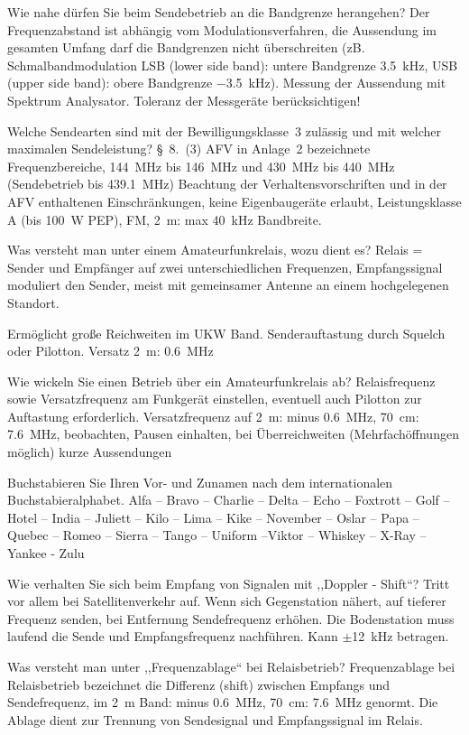 \documentclass[avery5371,grid,frame,a4paper]{flashcards}
\newcommand{\card}[3]{
  \begin{flashcard}[{\chap} -- #1]{#2}#3\end{flashcard}
}
\begin{document}
\card{09}{Wie nahe dürfen Sie beim Sendebetrieb an die Bandgrenze herangehen?}{
  Der Frequenzabstand ist abhängig vom Modulationsverfahren, die Aussendung im gesamten Umfang darf die Bandgrenzen nicht überschreiten (zB. Schmalbandmodulation LSB (lower side band): untere  Bandgrenze \SI{+3,5}{\kilo\Hz}, USB (upper side band): obere Bandgrenze \SI{-3,5}{\kilo\Hz}). Messung der Aussendung mit Spektrum Analysator. Toleranz der Messgeräte berücksichtigen!
}
\card{10}{Welche Sendearten sind mit der Bewilligungsklasse~3 zulässig und mit welcher maximalen Sendeleistung?}{
  §~8.~(3) AFV in Anlage~2 bezeichnete Frequenzbereiche, \SI{144}{\mega\Hz} bis \SI{146}{\mega\Hz} und \SI{430}{\mega\Hz} bis \SI{440}{\mega\Hz} (Sendebetrieb bis \SI{439,1}{\mega\Hz}) Beachtung der Verhaltensvorschriften und in der AFV enthaltenen Einschränkungen, keine Eigenbaugeräte erlaubt, Leistungsklasse A (bis \SI{100}{\watt} PEP), FM, 2~m: max \SI{40}{\kilo\Hz} Bandbreite.
}
\card{11}{Was versteht man unter einem Amateurfunkrelais, wozu dient es?}{
  Relais = Sender und Empfänger auf zwei unterschiedlichen Frequenzen, Empfangssignal moduliert den Sender, meist mit gemeinsamer Antenne an einem hochgelegenen Standort.

  Ermöglicht große Reichweiten im UKW Band.
  Senderauftastung durch Squelch oder Pilotton.
  Versatz 2~m: \SI{0,6}{\mega\Hz}
}
\card{12}{Wie wickeln Sie einen Betrieb über ein Amateurfunkrelais ab?}{
  Relaisfrequenz sowie Versatzfrequenz am Funkgerät einstellen, eventuell auch Pilotton zur Auftastung  erforderlich. Versatzfrequenz auf 2~m: minus \SI{0,6}{\mega\Hz}, \SI{70}{\centi\metre}: \SI{7,6}{\mega\Hz}, beobachten, Pausen einhalten, bei Überreichweiten (Mehrfachöffnungen möglich) kurze Aussendungen
}
\card{13}{Buchstabieren Sie Ihren Vor- und Zunamen nach dem internationalen Buchstabieralphabet.}{
  Alfa – Bravo – Charlie – Delta – Echo – Foxtrott – Golf – Hotel – India – Juliett – Kilo – Lima – Kike – November – Oslar – Papa – Quebec – Romeo – Sierra – Tango – Uniform –Viktor – Whiskey – X-Ray – Yankee - Zulu
}
\card{14}{Wie verhalten Sie sich beim Empfang von Signalen mit ,,Doppler - Shift``?}{
  Tritt vor allem bei Satellitenverkehr auf. Wenn sich Gegenstation nähert, auf tieferer Frequenz senden, bei Entfernung Sendefrequenz erhöhen. Die Bodenstation muss laufend die Sende und Empfangsfrequenz      nachführen. Kann $\pm$\SI{12}{\kilo\Hz} betragen.
}
\card{15}{Was versteht man unter ,,Frequenzablage`` bei Relaisbetrieb?}{
  Frequenzablage bei Relaisbetrieb bezeichnet die Differenz (shift) zwischen Empfangs und Sendefrequenz, im 2~m Band: minus \SI{0,6}{\mega\Hz}, \SI{70}{\centi\metre}: \SI{7,6}{\mega\Hz} genormt. Die Ablage dient zur Trennung von Sendesignal und Empfangssignal im Relais.
}
\end{document}
